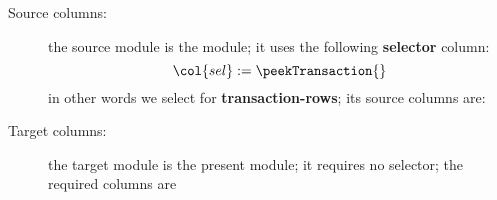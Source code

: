 \begin{description}
	\item[Source columns:] the source module is the \hubMod{} module; it uses the following \textbf{selector} column:
		\[
			\col{sel} := \peekTransaction{}
		\]
		in other words we select for \textbf{transaction-rows}; its source columns are:
		\begin{multicols}{3}
			\begin{enumerate}
					\lookupColumnsHubIntoTxnData{}					%
			\end{enumerate}
		\end{multicols}
	\item[Target columns:] the target module is the present \txnDataMod{} module; it requires no selector; the required columns are
		\begin{multicols}{3}
			\begin{enumerate}
					\lookupColumnsHubIntoTxnData{}					%
			\end{enumerate}
		\end{multicols}
\end{description}

